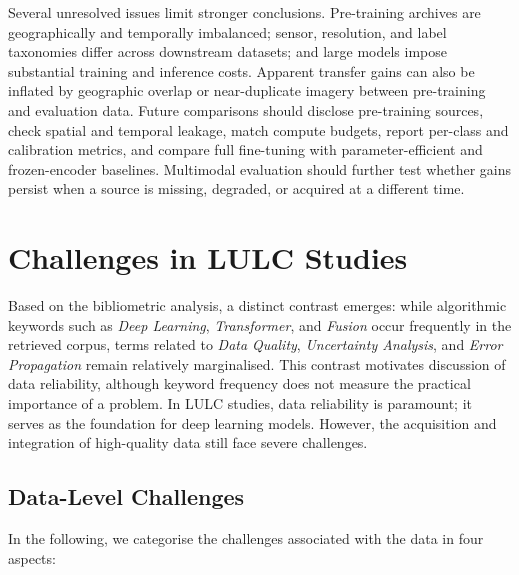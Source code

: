 \documentclass[]{interact}
\theoremstyle{plain}%
\theoremstyle{definition}
\theoremstyle{remark}
\begin{document}
Several unresolved issues limit stronger conclusions. Pre-training archives are geographically and temporally imbalanced; sensor, resolution, and label taxonomies differ across downstream datasets; and large models impose substantial training and inference costs. Apparent transfer gains can also be inflated by geographic overlap or near-duplicate imagery between pre-training and evaluation data. Future comparisons should disclose pre-training sources, check spatial and temporal leakage, match compute budgets, report per-class and calibration metrics, and compare full fine-tuning with parameter-efficient and frozen-encoder baselines. Multimodal evaluation should further test whether gains persist when a source is missing, degraded, or acquired at a different time.

\section{Challenges in LULC Studies}
Based on the bibliometric analysis, a distinct contrast emerges: while algorithmic keywords such as \textit{Deep Learning}, \textit{Transformer}, and \textit{Fusion} occur frequently in the retrieved corpus, terms related to \textit{Data Quality}, \textit{Uncertainty Analysis}, and \textit{Error Propagation} remain relatively marginalised. This contrast motivates discussion of data reliability, although keyword frequency does not measure the practical importance of a problem. In LULC studies, data reliability is paramount; it serves as the foundation for deep learning models. However, the acquisition and integration of high-quality data still face severe challenges.

\subsection{Data-Level Challenges}

In the following, we categorise the challenges associated with the data in four aspects:
\end{document}
